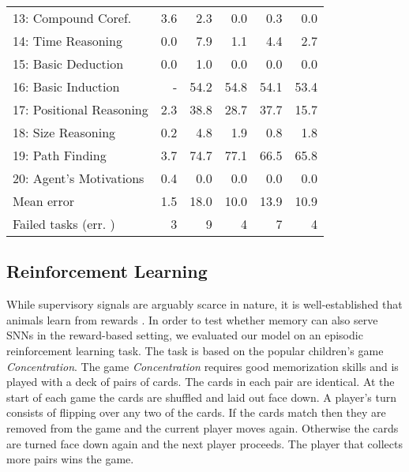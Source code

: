 \documentclass{article}
\begin{document}
\begin{table}
\begin{tabular}{@{}lrrrrr@{}}
13: Compound Coref.                 & 3.6 & 2.3  & 0.0  & 0.3  & 0.0  \\
14: Time Reasoning                  & 0.0 & 7.9  & 1.1  & 4.4  & 2.7  \\
15: Basic Deduction                 & 0.0 & 1.0  & 0.0  & 0.0  & 0.0  \\
16: Basic Induction                 & -   & 54.2 & 54.8 & 54.1 & 53.4 \\
17: Positional Reasoning            & 2.3 & 38.8 & 28.7 & 37.7 & 15.7 \\
18: Size Reasoning                  & 0.2 & 4.8  & 1.9  & 0.8  & 1.8  \\
19: Path Finding                    & 3.7 & 74.7 & 77.1 & 66.5 & 65.8 \\
20: Agent's Motivations             & 0.4 & 0.0  & 0.0  & 0.0  & 0.0  \\
\cmidrule(lr){2-2} \cmidrule(lr){3-4} \cmidrule(l){5-6}
Mean error                          & 1.5 & 18.0 & 10.0 & 13.9 & 10.9 \\
Failed tasks (err. ) & 3 & 9 & 4    & 7 & 4 \\
\bottomrule
\end{tabular}
\label{tab:tab1}
\end{table}

\subsection{Reinforcement Learning}
\label{sec:results-reinforcement_learning}
While supervisory signals are arguably scarce in nature, it is well-established that animals learn from rewards \cite{schultz2002getting}. In order to test whether memory can also serve SNNs in the reward-based setting, we evaluated our model on an episodic reinforcement learning task. The task is based on the popular children's game \emph{Concentration}. The game \emph{Concentration} requires good memorization skills and is played with a deck of  pairs of cards. The cards in each pair are identical. At the start of each game the cards are shuffled and laid out face down. A player's turn consists of flipping over any two of the cards. If the cards match then they are removed from the game and the current player moves again. Otherwise the cards are turned face down again and the next player proceeds. The player that collects more pairs wins the game. 
\end{document}

